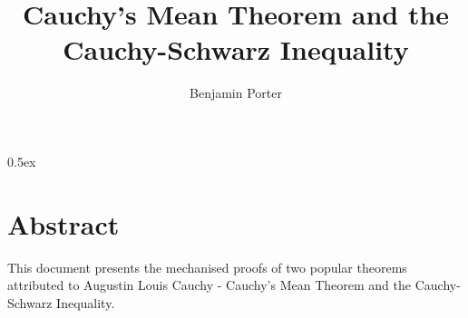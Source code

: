 \documentclass[11pt,a4paper,oneside]{book}
\begin{document}
\title{Cauchy's Mean Theorem and the Cauchy-Schwarz Inequality}
\author{Benjamin Porter}
\maketitle

\tableofcontents

\parindent 0pt\parskip 0.5ex

\chapter*{Abstract}

This document presents the mechanised proofs of two popular theorems
attributed to Augustin Louis Cauchy - Cauchy's Mean Theorem and the
Cauchy-Schwarz Inequality.



\end{document}
